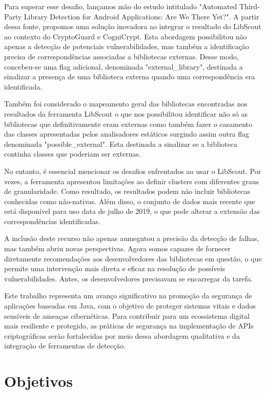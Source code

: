 Para superar esse desafio, lançamos mão do estudo  intitulado "Automated Third-Party Library Detection for Android Applications: Are We There Yet?". A partir dessa fonte, propomos uma solução inovadora ao integrar o resultado do LibScout ao contexto do CryptoGuard e CogniCrypt. Esta abordagem possibilitou não apenas a detecção de potenciais vulnerabilidades, mas também a identificação precisa de correspondências associadas a bibliotecas externas. Desse modo, concebeu-se uma flag adicional, denominada "external\_library", destinada a sinalizar a presença de uma biblioteca externa quando uma correspondência era identificada.

Também foi considerado o mapeamento geral das bibliotecas encontradas nos resultados da ferramenta LibScout o que nos possibilitou identificar não só as bibliotecas que definitivamente eram externas como também fazer o casamento das classes apresentadas pelos analisadores estáticos surgindo assim outra flag denominada "possible\_external". Esta destinada a sinalizar se a biblioteca continha classes que poderiam ser externas. 

No entanto, é essencial mencionar os desafios enfrentados ao usar o LibScout. Por vezes, a ferramenta apresentou limitações ao definir clusters com diferentes graus de granularidade. Como resultado, os resultados podem não incluir bibliotecas conhecidas como não-nativas. Além disso, o conjunto de dados mais recente que está disponível para uso data de julho de 2019, o que pode alterar a extensão das correspondências identificadas.

A inclusão deste recurso não apenas aumegntou a precisão da detecção de falhas, mas também abriu novas perspectivas. Agora somos capazes de fornecer diretamente recomendações aos desenvolvedores das bibliotecas em questão, o que permite uma intervenção mais direta e eficaz na resolução de possíveis vulnerabilidades. Antes, os desenvolvedores precisavam se encarregar da tarefa.

Este trabalho representa um avanço significativo na promoção da segurança de aplicações baseadas em Java, com o objetivo de proteger sistemas vitais e dados sensíveis de ameaças cibernéticas. Para contribuir para um ecossistema digital mais resiliente e protegido, as práticas de segurança na implementação de APIs criptográficas serão fortalecidas por meio dessa abordagem qualitativa e da integração de ferramentas de detecção.

\section{Objetivos}

